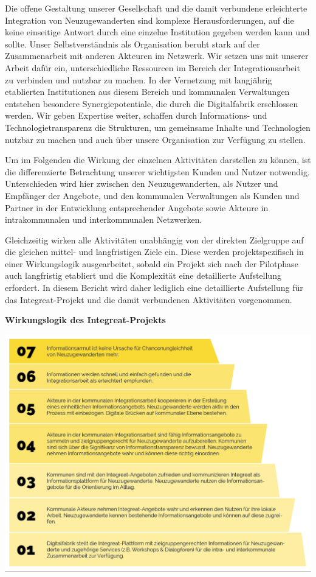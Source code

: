 \documentclass[12pt, a4paper]{article} %
\begin{document}
Die offene Gestaltung unserer Gesellschaft und die damit verbundene
erleichterte Integration von Neuzugewanderten sind komplexe
Herausforderungen, auf die keine einseitige Antwort durch eine einzelne
Institution gegeben werden kann und sollte. Unser Selbstverständnis als
Organisation beruht stark auf der Zusammenarbeit mit anderen Akteuren im
Netzwerk. Wir setzen uns mit unserer Arbeit dafür ein, unterschiedliche
Ressourcen im Bereich der Integrationsarbeit zu verbinden und nutzbar zu
machen. In der Vernetzung mit langjährig etablierten Institutionen aus
diesem Bereich und kommunalen Verwaltungen entstehen besondere
Synergiepotentiale, die durch die Digitalfabrik erschlossen werden. Wir
geben Expertise weiter, schaffen durch Informations- und
Technologietransparenz die Strukturen, um gemeinsame Inhalte und
Technologien nutzbar zu machen und auch über unsere Organisation zur
Verfügung zu stellen.

Um im Folgenden die Wirkung der einzelnen Aktivitäten darstellen zu
können, ist die differenzierte Betrachtung unserer wichtigsten Kunden
und Nutzer notwendig. Unterschieden wird hier zwischen den
Neuzugewanderten, als Nutzer und Empfänger der Angebote, und den
kommunalen Verwaltungen als Kunden und Partner in der Entwicklung
entsprechender Angebote sowie Akteure in intrakommunalen und
interkommunalen Netzwerken.

Gleichzeitig wirken alle Aktivitäten unabhängig von der direkten
Zielgruppe auf die gleichen mittel- und langfristigen Ziele ein. Diese
werden projektspezifisch in einer Wirkungslogik ausgearbeitet, sobald
ein Projekt sich nach der Pilotphase auch langfristig etabliert und die
Komplexität eine detaillierte Aufstellung erfordert. In diesem Bericht
wird daher lediglich eine detaillierte Aufstellung für das
Integreat-Projekt und die damit verbundenen Aktivitäten vorgenommen.


\begin{minipage}[h]{\textwidth}
    \textbf{Wirkungslogik des Integreat-Projekts}
    \centering

    \includegraphics[width=\textwidth]{./media/image2.png}
\end{minipage}
\end{document}
